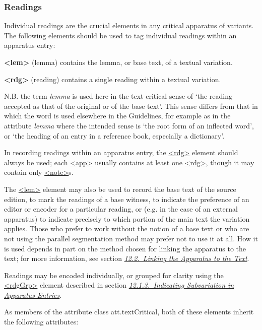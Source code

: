 \subsubsection[{Readings}]{Readings}\label{TCAPLR}\par
Individual readings are the crucial elements in any critical apparatus of variants. The following elements should be used to tag individual readings within an apparatus entry: 
\begin{sansreflist}
  
\item [\textbf{<lem>}] (lemma) contains the lemma, or base text, of a textual variation.
\item [\textbf{<rdg>}] (reading) contains a single reading within a textual variation.
\end{sansreflist}
 N.B. the term \textit{lemma} is used here in the text-critical sense of ‘the reading accepted as that of the original or of the base text’. This sense differs from that in which the word is used elsewhere in the Guidelines, for example as in the attribute {\itshape lemma} where the intended sense is ‘the root form of an inflected word’, or ‘the heading of an entry in a reference book, especially a dictionary’. \par
In recording readings within an apparatus entry, the \hyperref[TEI.rdg]{<rdg>} element should always be used; each \hyperref[TEI.app]{<app>} usually contains at least one \hyperref[TEI.rdg]{<rdg>}, though it may contain only \hyperref[TEI.note]{<note>}s.\par
The \hyperref[TEI.lem]{<lem>} element may also be used to record the base text of the source edition, to mark the readings of a base witness, to indicate the preference of an editor or encoder for a particular reading, or (e.g. in the case of an external apparatus) to indicate precisely to which portion of the main text the variation applies. Those who prefer to work without the notion of a base text or who are not using the parallel segmentation method may prefer not to use it at all. How it is used depends in part on the method chosen for linking the apparatus to the text; for more information, see section \textit{\hyperref[TCAPLK]{12.2.\ Linking the Apparatus to the Text}}.\par
Readings may be encoded individually, or grouped for clarity using the \hyperref[TEI.rdgGrp]{<rdgGrp>} element described in section \textit{\hyperref[TCAPSU]{12.1.3.\ Indicating Subvariation in Apparatus Entries}}.\par
As members of the attribute class \textsf{att.textCritical}, both of these elements inherit the following attributes: 
